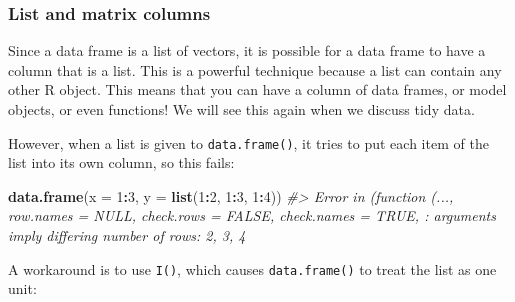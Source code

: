 \documentclass[]{book}
\newenvironment{Shaded}{\begin{snugshade}}{\end{snugshade}}
\newcommand{\CommentTok}[1]{\textcolor[rgb]{0.56,0.35,0.01}{\textit{#1}}}
\newcommand{\DataTypeTok}[1]{\textcolor[rgb]{0.13,0.29,0.53}{#1}}
\newcommand{\DecValTok}[1]{\textcolor[rgb]{0.00,0.00,0.81}{#1}}
\newcommand{\KeywordTok}[1]{\textcolor[rgb]{0.13,0.29,0.53}{\textbf{#1}}}
\newcommand{\NormalTok}[1]{#1}
\newcommand{\OperatorTok}[1]{\textcolor[rgb]{0.81,0.36,0.00}{\textbf{#1}}}
\newcommand{\StringTok}[1]{\textcolor[rgb]{0.31,0.60,0.02}{#1}}
\theoremstyle{definition}
\theoremstyle{definition}
\theoremstyle{definition}
\theoremstyle{remark}
\begin{document}
\hypertarget{list-and-matrix-columns}{%
\subsubsection{List and matrix columns}\label{list-and-matrix-columns}}

Since a data frame is a list of vectors, it is possible for a data frame
to have a column that is a list. This is a powerful technique because a
list can contain any other R object. This means that you can have a
column of data frames, or model objects, or even functions! We will see
this again when we discuss tidy data.

\begin{Shaded}
\end{Shaded}

However, when a list is given to \texttt{data.frame()}, it tries to put
each item of the list into its own column, so this fails:

\begin{Shaded}
\begin{Highlighting}[]
\KeywordTok{data.frame}\NormalTok{(}\DataTypeTok{x =} \DecValTok{1}\OperatorTok{:}\DecValTok{3}\NormalTok{, }\DataTypeTok{y =} \KeywordTok{list}\NormalTok{(}\DecValTok{1}\OperatorTok{:}\DecValTok{2}\NormalTok{, }\DecValTok{1}\OperatorTok{:}\DecValTok{3}\NormalTok{, }\DecValTok{1}\OperatorTok{:}\DecValTok{4}\NormalTok{))}
\CommentTok{#> Error in (function (..., row.names = NULL, check.rows = FALSE, check.names = TRUE, : arguments imply differing number of rows: 2, 3, 4}
\end{Highlighting}
\end{Shaded}

A workaround is to use \texttt{I()}, which causes \texttt{data.frame()}
to treat the list as one unit:
\end{document}
